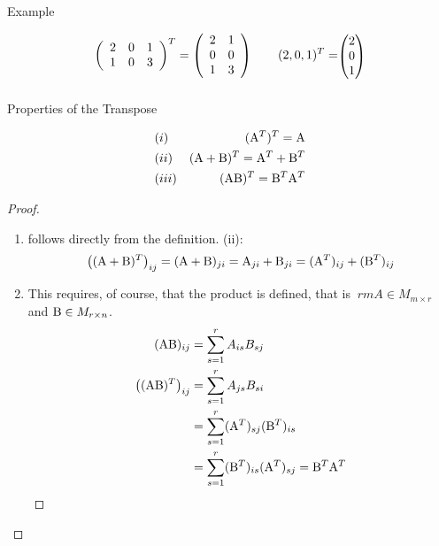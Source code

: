 \documentclass[
  letterpaper,
  DIV=11,
  numbers=noendperiod]{scrartcl}
\makeatletter
\let\oldsubparagraph\subparagraph
\renewcommand{\subparagraph}{
    \@ifstar
      \xxxSubParagraphStar
      \xxxSubParagraphNoStar
  }
\newcommand{\xxxSubParagraphStar}[1]{\oldsubparagraph*{#1}\mbox{}}
\newcommand{\xxxSubParagraphNoStar}[1]{\oldsubparagraph{#1}\mbox{}}
\providecommand{\tightlist}{%
  \setlength{\itemsep}{0pt}\setlength{\parskip}{0pt}}
\theoremstyle{remark}
\makeatother
\begin{document}
\subparagraph{Example}\label{example}

\[\left( \begin{array}{rrr}
 2  & 0  & 1  \\
 1  & 0  & 3  
\end{array}  \right)^T=\left( \begin{array}{rrr}
 2  & 1  \\
 0 & 0  \\
 1 & 3 \\
\end{array}  \right)    \qquad  (2, 0 , 1)^{T} = \scriptstyle \begin{pmatrix}   2\\ 0 \\ 1  \end{pmatrix} \textstyle\]

\subparagraph{Properties of the
Transpose}\label{properties-of-the-transpose}

\[\begin{aligned}
&(i)& ({\rm A}^T)^T  =  {\rm A}   \\ 
&(ii)& ({\rm A}+{\rm B})^T  =  {\rm A}^T+{\rm B}^T \\
&(iii)&({\rm A}{\rm B})^T  =  {\rm B}^T{\rm A}^T 
\end{aligned}\]

\begin{proof}
\leavevmode

\begin{enumerate}
\def\labelenumi{(\roman{enumi})}
\tightlist
\item
  follows directly from the definition. (ii):
  \[\left( ({\rm A} + {\rm B})^{T}\right)_{ij} =  ({\rm A} + {\rm B})_{ji} = {\rm A}_{ji} + {\rm B}_{ji}  = ({\rm A}^{T})_{ij} + ({\rm B}^{T})_{ij}\]
\item
  This requires, of course, that the product is defined, that is
  \({\ rm A}\in M_{m \times r}\) and \({\rm B}\in M_{r \times n}\).
  \[\begin{aligned}
   ({\rm A} {\rm B})_{ij} & = \sum_{s=1}^{r} A_{is}B_{sj} \\
  \left( ({\rm A} {\rm B})^{T}\right)_{ij} & = \sum_{s=1}^{r} A_{js}B_{si} \\
  & = \sum_{s=1}^{r} ({\rm A}^{T})_{sj}({\rm B}^{T})_{is}  \\
  & =\sum_{s=1}^{r} ({\rm B}^{T})_{is} ({\rm A}^{T})_{sj} = {\rm B}^{T} {\rm A}^{T}
  \end{aligned}\]~◻
\end{enumerate}

\end{proof}
\end{document}
